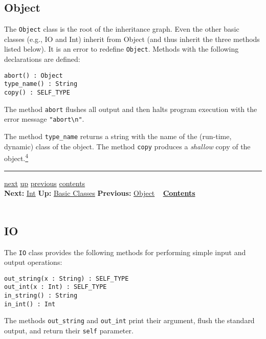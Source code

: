 \documentclass[]{article}
\begin{document}
\subsection{Object}

The \texttt{Object} class is the root of the inheritance graph. Even the
other basic classes (e.g., IO and Int) inherit from Object (and thus
inherit the three methods listed below). It is an error to redefine
\texttt{Object}. Methods with the following declarations are defined:

\begin{verbatim}
abort() : Object
type_name() : String
copy() : SELF_TYPE
\end{verbatim}

The method \texttt{abort} flushes all output and then halts program
execution with the error message \texttt{"abort\textbackslash{}n"}.

The method \texttt{type\_name} returns a string with the name of the
(run-time, dynamic) class of the object. The method \texttt{copy}
produces a \emph{shallow} copy of the
object.\href{footnode.html\#foot715}{\textsuperscript{4}}

\begin{center}\rule{3in}{0.4pt}\end{center}

\href{node29.html}{next} \href{node26.html}{up}
\href{node27.html}{previous} \href{node1.html}{contents} \\
\textbf{Next:} \href{node29.html}{Int} \textbf{Up:}
\href{node26.html}{Basic Classes} \textbf{Previous:}
\href{node27.html}{Object} ~ \textbf{\href{node1.html}{Contents}} \\ \\

\subsection{IO}

The \texttt{IO} class provides the following methods for performing
simple input and output operations:

\begin{verbatim}
out_string(x : String) : SELF_TYPE
out_int(x : Int) : SELF_TYPE
in_string() : String
in_int() : Int
\end{verbatim}

The methods \texttt{out\_string} and \texttt{out\_int} print their
argument, flush the standard output, and return their \texttt{self}
parameter.
\end{document}
